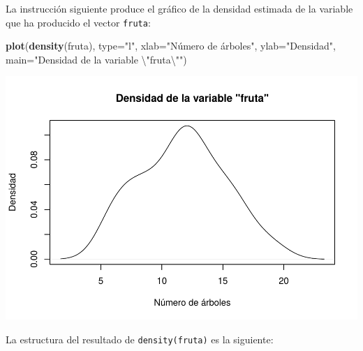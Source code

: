 \documentclass[
]{book}
\newenvironment{Shaded}{\begin{snugshade}}{\end{snugshade}}
\newcommand{\CharTok}[1]{\textcolor[rgb]{0.31,0.60,0.02}{#1}}
\newcommand{\CommentTok}[1]{\textcolor[rgb]{0.56,0.35,0.01}{\textit{#1}}}
\newcommand{\DataTypeTok}[1]{\textcolor[rgb]{0.13,0.29,0.53}{#1}}
\newcommand{\KeywordTok}[1]{\textcolor[rgb]{0.13,0.29,0.53}{\textbf{#1}}}
\newcommand{\NormalTok}[1]{#1}
\newcommand{\StringTok}[1]{\textcolor[rgb]{0.31,0.60,0.02}{#1}}
\theoremstyle{definition}
\theoremstyle{definition}
\theoremstyle{definition}
\theoremstyle{remark}
\begin{document}
La instrucción siguiente produce el gráfico de la densidad estimada de la variable que ha producido el vector \texttt{fruta}:

\begin{Shaded}
\begin{Highlighting}[]
\KeywordTok{plot}\NormalTok{(}\KeywordTok{density}\NormalTok{(fruta), }\DataTypeTok{type=}\StringTok{"l"}\NormalTok{, }\DataTypeTok{xlab=}\StringTok{"Número de árboles"}\NormalTok{,}
  \DataTypeTok{ylab=}\StringTok{"Densidad"}\NormalTok{, }\DataTypeTok{main=}\StringTok{"Densidad de la variable }\CharTok{\textbackslash{}"}\StringTok{fruta}\CharTok{\textbackslash{}"}\StringTok{"}\NormalTok{)}
\end{Highlighting}
\end{Shaded}

\begin{center}\includegraphics[width=0.9\linewidth]{13chap13_Agrupados_files/figure-latex/unnamed-chunk-79-1} \end{center}

La estructura del resultado de \texttt{density(fruta)} es la siguiente:

\begin{Shaded}
\end{Shaded}
\end{document}
